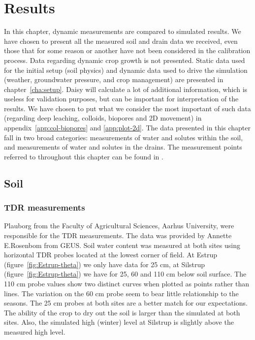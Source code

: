 \chapter{Results}

In this chapter, dynamic measurements are compared to simulated
results.  We have chosen to present all the measured soil and drain
data we received, even those that for some reason or another have not
been considered in the calibration process.  Data regarding dynamic
crop growth is not presented.  Static data used for the initial setup
(soil physics) and dynamic data used to drive the simulation (weather,
groundwater pressure, and crop management) are presented in
chapter~\ref{cha:setup}.  Daisy will calculate a lot of additional
information, which is useless for validation purposes, but can be
important for interpretation of the results.  We have chosen to put
what we consider the most important of such data (regarding deep
leaching, colloids, biopores and 2D movement) in
appendix~\ref{app:col-biopores} and \ref{app:plot-2d}.  The data
presented in this chapter fall in two broad categories: measurements
of water and solutes within the soil, and measurements of water and
solutes in the drains.  The measurement points referred to throughout
this chapter can be found in \citet{vap2009}.

\section{Soil}

\subsection{TDR measurements}

Plauborg from the Faculty of Agricultural Sciences, Aarhus University,
were responsible for the TDR measurements.  The data was provided by
Annette E.\@ Rosenbom from GEUS.  Soil water content was measured at
both sites using horizontal TDR probes located at the lowest corner of
field.  At Estrup (figure~\ref{fig:Estrup-theta}) we only have data
for 25 cm, at Silstrup (figure~\ref{fig:Estrup-theta}) we have for 25,
60 and 110 cm below soil surface.  The 110 cm probe values show two
distinct curves when plotted as points rather than lines.  The
variation on the 60 cm probe seem to bear little relationship to the
seasons.  The 25 cm probes at both sites are a better match for our
expectations.  The ability of the crop to dry out the soil is larger
than the simulated at both sites.  Also, the simulated high (winter)
level at Silstrup is slightly above the measured high level.


